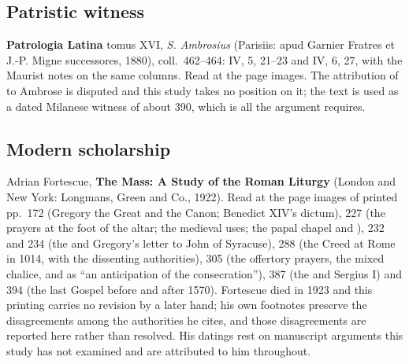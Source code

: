 \subsection*{Patristic witness}

\textbf{Patrologia Latina} tomus XVI, \emph{S. Ambrosius} (Parisiis: apud
Garnier Fratres et J.-P. Migne successores, 1880), coll.~462--464:
 IV, 5, 21--23 and IV, 6, 27, with the Maurist notes on
the same columns. Read at the page images. The attribution of  to Ambrose is disputed and this study takes no position on it;
the text is used as a dated Milanese witness of about 390, which is all the
argument requires.

\subsection*{Modern scholarship}

Adrian Fortescue, \textbf{The Mass: A Study of the Roman Liturgy} (London and
New York: Longmans, Green and Co., 1922). Read at the page images of printed
pp.~172 (Gregory the Great and the Canon; Benedict XIV's dictum), 227 (the
prayers at the foot of the altar; the medieval uses; the papal chapel and
), 232 and 234 (the  and Gregory's
letter to John of Syracuse), 288 (the Creed at Rome in 1014, with the
dissenting authorities), 305 (the offertory prayers, the mixed chalice, and
 as ``an anticipation of the consecration''), 387
(the  and Sergius I) and 394 (the last Gospel before and
after 1570). Fortescue died in 1923 and this printing carries no revision by a
later hand; his own footnotes preserve the disagreements among the authorities
he cites, and those disagreements are reported here rather than resolved. His
datings rest on manuscript arguments this study has not examined and are
attributed to him throughout.
